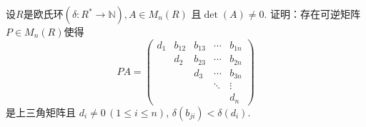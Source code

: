 \begin{problem}
    设$R$是欧氏环$(\delta: R^* \to \mathbb{N}), A \in M_n(R)$
且$\det(A) \neq 0$. 证明：存在可逆矩阵$P \in M_n(R)$使得
\[
    PA = 
    \begin{pmatrix}
        d_1 & b_{12} & b_{13} & \cdots & b_{1n}\\
        & d_2 & b_{23} & \cdots & b_{2n}\\
        & & d_3 & \cdots & b_{3n}\\
        & & & \ddots & \vdots\\
        & & & & d_n
    \end{pmatrix}
\]
是上三角矩阵且
$d_i \neq 0 \, (1 \leqslant i \leqslant n),\, \delta(b_{ji}) < \delta(d_i)$.
\end{problem}

\begin{solution}
    
\end{solution}